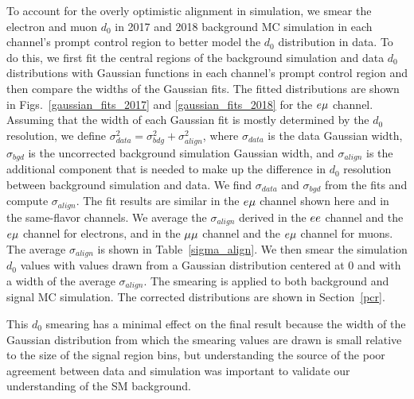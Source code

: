 To account for the overly optimistic alignment in simulation, we smear the electron and muon $d_0$ in 2017 and 2018 background MC simulation in each channel's prompt control region to better model the $d_0$ distribution in data. To do this, we first fit the central regions of the background simulation and data $d_0$ distributions with Gaussian functions in each channel's prompt control region and then compare the widths of the Gaussian fits. The fitted distributions are shown in Figs.~\ref{gaussian_fits_2017} and \ref{gaussian_fits_2018} for the $e{\mu}$ channel. Assuming that the width of each Gaussian fit is mostly determined by the $d_0$ resolution, we define $\sigma_{data}^2 = \sigma_{bdg}^2 + \sigma_{align}^2$, where $\sigma_{data}$ is the data Gaussian width, $\sigma_{bgd}$ is the uncorrected background simulation Gaussian width, and $\sigma_{align}$ is the additional component that is needed to make up the difference in $d_0$ resolution between background simulation and data. We find $\sigma_{data}$ and $\sigma_{bgd}$ from the fits and compute $\sigma_{align}$. The fit results are similar in the $e{\mu}$ channel shown here and in the same-flavor channels. We average the $\sigma_{align}$ derived in the $ee$ channel and the $e{\mu}$ channel for electrons, and in the ${\mu}{\mu}$ channel and the $e{\mu}$ channel for muons. The average $\sigma_{align}$ is shown in Table~\ref{sigma_align}. We then smear the simulation $d_0$ values with values drawn from a Gaussian distribution centered at 0 and with a width of the average $\sigma_{align}$. The smearing is applied to both background and signal MC simulation. The corrected \ad distributions are shown in Section~\ref{pcr}.




This $d_0$ smearing has a minimal effect on the final result because the width of the Gaussian distribution from which the smearing values are drawn is small relative to the size of the signal region bins, but understanding the source of the poor agreement between data and simulation was important to validate our understanding of the SM background.

